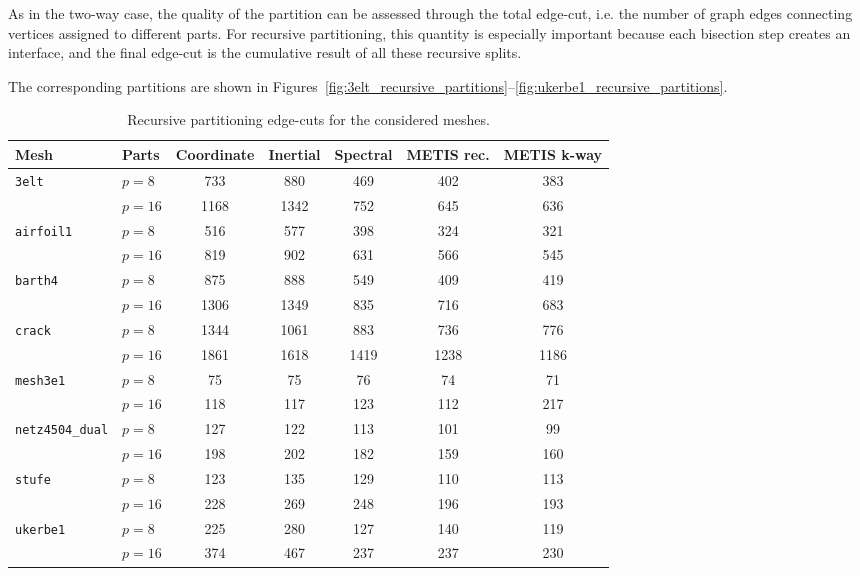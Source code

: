 \documentclass[unicode,10pt,a4paper,oneside,numbers=endperiod,openany]{scrartcl}
\begin{document}
As in the two-way case, the quality of the partition can be assessed through the total edge-cut,
i.e. the number of graph edges connecting vertices assigned to different parts. For recursive
partitioning, this quantity is especially important because each bisection step creates an
interface, and the final edge-cut is the cumulative result of all these recursive splits.

The corresponding partitions are shown in Figures~\ref{fig:3elt_recursive_partitions}--\ref{fig:ukerbe1_recursive_partitions}.

\begin{table}[h]
\centering
\begin{tabular}{llccccc}
\hline
\textbf{Mesh} & \textbf{Parts} & \textbf{Coordinate} & \textbf{Inertial} & \textbf{Spectral} & \textbf{METIS rec.} & \textbf{METIS k-way} \\
\hline
\multirow{2}{*}{\texttt{3elt}}
    & \(p=8\)  & 733  & 880  & 469  & 402  & 383  \\
    & \(p=16\) & 1168 & 1342 & 752  & 645  & 636  \\
\hline
\multirow{2}{*}{\texttt{airfoil1}}
    & \(p=8\)  & 516 & 577 & 398 & 324 & 321 \\
    & \(p=16\) & 819 & 902 & 631 & 566 & 545 \\
\hline
\multirow{2}{*}{\texttt{barth4}}
    & \(p=8\)  & 875  & 888  & 549  & 409  & 419  \\
    & \(p=16\) & 1306 & 1349 & 835  & 716  & 683  \\
\hline
\multirow{2}{*}{\texttt{crack}}
    & \(p=8\)  & 1344 & 1061 & 883  & 736  & 776  \\
    & \(p=16\) & 1861 & 1618 & 1419 & 1238 & 1186 \\
\hline
\multirow{2}{*}{\texttt{mesh3e1}}
    & \(p=8\)  & 75  & 75  & 76  & 74  & 71  \\
    & \(p=16\) & 118 & 117 & 123 & 112 & 217 \\
\hline
\multirow{2}{*}{\texttt{netz4504\_dual}}
    & \(p=8\)  & 127 & 122 & 113 & 101 & 99  \\
    & \(p=16\) & 198 & 202 & 182 & 159 & 160 \\
\hline
\multirow{2}{*}{\texttt{stufe}}
    & \(p=8\)  & 123 & 135 & 129 & 110 & 113 \\
    & \(p=16\) & 228 & 269 & 248 & 196 & 193 \\
\hline
\multirow{2}{*}{\texttt{ukerbe1}}
    & \(p=8\)  & 225 & 280 & 127 & 140 & 119 \\
    & \(p=16\) & 374 & 467 & 237 & 237 & 230 \\
\hline
\end{tabular}
\caption{Recursive partitioning edge-cuts for the considered meshes.}
\label{tab:recursive_edgecuts_first}
\end{table}
\end{document}
